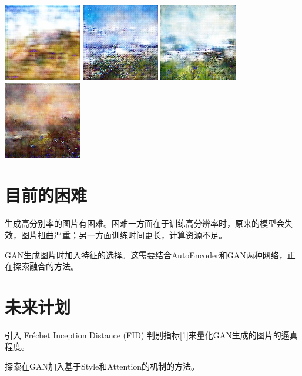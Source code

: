 \documentclass{article}
\begin{document}
\begin{CJK*}{UTF8}{gbsn}
\includegraphics{./eg1.jpg}
\includegraphics{./eg2.jpg}
\includegraphics{./eg4.jpg}
\includegraphics{./eg5.jpg}



\section{目前的困难}

生成高分别率的图片有困难。困难一方面在于训练高分辨率时，原来的模型会失效，图片扭曲严重；另一方面训练时间更长，计算资源不足。

GAN生成图片时加入特征的选择。这需要结合AutoEncoder和GAN两种网络，正在探索融合的方法。


\section{未来计划}

引入 Fréchet Inception Distance (FID) 判别指标[1]来量化GAN生成的图片的逼真程度。

探索在GAN加入基于Style和Attention的机制的方法。


\end{CJK*}
\end{document}
